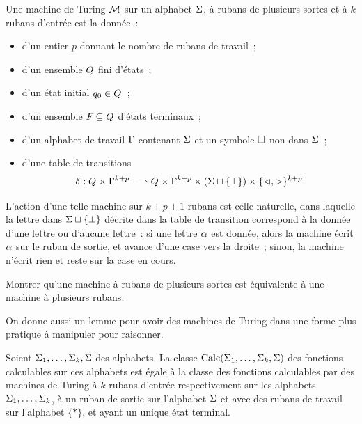 \begin{definition}
  Une machine de Turing $\mathcal{M}$ sur un alphabet $\Sigma$, à rubans de plusieurs
  sortes et à $k$ rubans d'entrée est la donnée~:
  \begin{itemize}
  \item d'un entier $p$ donnant le nombre de rubans de travail~;
  \item d'un ensemble $Q_{}$ fini d'états~;
  \item d'un état initial $q_{0}\in Q_{}$~;
  \item d'un ensemble $F_{}\subseteq Q_{}$ d'états terminaux~;
  \item d'un alphabet de travail $\Gamma$ contenant $\Sigma$ et un symbole $\square$
    non dans $\Sigma$~;
  \item d'une table de transitions
    \[\makeFunNamePartial{\trA}{\varQQ\times\ABB^{k+p}}
                         {\varQQ\times\ABB^{k+p}\times(\ABA\sqcup\{\bot\})
                           \times\{\lTr,\rTr\}^{k+p}}\]
  \end{itemize}
\end{definition}

L'action d'une telle machine sur $k+p+1$ rubans est celle naturelle, dans
laquelle la lettre dans $\Sigma\sqcup\{\bot\}$ décrite dans la table de transition
correspond à la donnée d'une lettre ou d'aucune lettre~: si une lettre $\alpha$
est donnée, alors la machine écrit $\alpha$ sur le ruban de sortie, et avance
d'une case vers la droite~; sinon, la machine n'écrit rien et reste sur la case
en cours.

\begin{exercise}
  Montrer qu'une machine à rubans de plusieurs sortes est équivalente à une
  machine à plusieurs rubans.
\end{exercise}

\noindent
On donne aussi un lemme pour avoir des machines de Turing dans une forme plus
pratique à manipuler pour raisonner.

\begin{lemma}\label{lem.norm.TM}
  Soient $\Sigma_1,\ldots,\Sigma_k,\Sigma$ des alphabets. La classe
  $\operatorname{Calc}(\Sigma_1,\ldots,\Sigma_k,\Sigma)$ des fonctions calculables sur ces alphabets
  est égale à la classe des fonctions calculables par des machines de Turing
  à $k$ rubans d'entrée respectivement sur les alphabets $\Sigma_1,\ldots,\Sigma_k$,
  à un ruban de sortie sur l'alphabet $\Sigma$ et avec des rubans de travail sur
  l'alphabet $\{*\}$, et ayant un unique état terminal.
\end{lemma}

